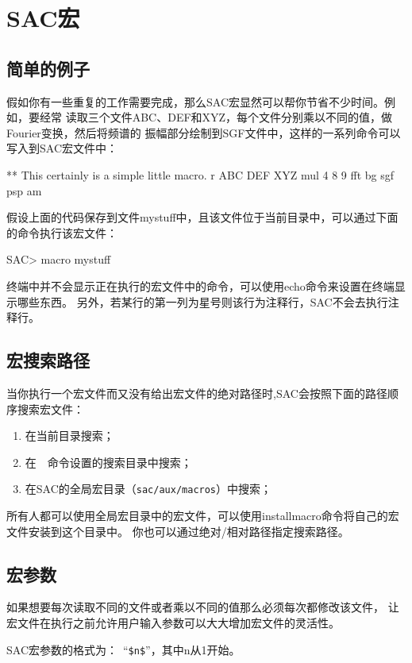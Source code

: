 \section{SAC宏}
\label{sec:macros}

\subsection{简单的例子}
假如你有一些重复的工作需要完成，那么SAC宏显然可以帮你节省不少时间。例如，要经常
读取三个文件ABC、DEF和XYZ，每个文件分别乘以不同的值，做Fourier变换，然后将频谱的
振幅部分绘制到SGF文件中，这样的一系列命令可以写入到SAC宏文件中：
\begin{SACCode}
** This certainly is a simple little macro.
r ABC DEF XYZ
mul 4 8 9
fft
bg sgf
psp am
\end{SACCode}

假设上面的代码保存到文件mystuff中，且该文件位于当前目录中，可以通过下面的命令执行该宏文件：
\begin{SACCode}
SAC> macro mystuff
\end{SACCode}
终端中并不会显示正在执行的宏文件中的命令，可以使用echo命令来设置在终端显示哪些东西。
另外，若某行的第一列为星号则该行为注释行，SAC不会去执行注释行。

\subsection{宏搜索路径}
当你执行一个宏文件而又没有给出宏文件的绝对路径时,SAC会按照下面的路径顺序搜索宏文件：
\begin{enumerate}
\item 在当前目录搜索；
\item 在~~命令设置的搜索目录中搜索；
\item 在SAC的全局宏目录（\texttt{sac/aux/macros}）中搜索；
\end{enumerate}

所有人都可以使用全局宏目录中的宏文件，可以使用installmacro命令将自己的宏文件安装到这个目录中。
你也可以通过绝对/相对路径指定搜索路径。

\subsection{宏参数}
如果想要每次读取不同的文件或者乘以不同的值那么必须每次都修改该文件，
让宏文件在执行之前允许用户输入参数可以大大增加宏文件的灵活性。

SAC宏参数的格式为：~``\verb+$n$+''，其中n从1开始。

